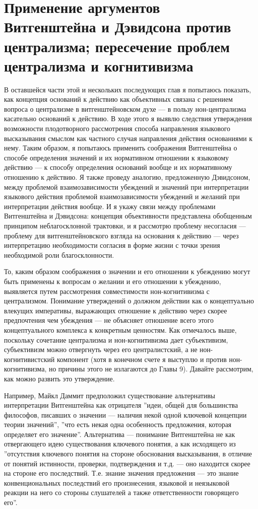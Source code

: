 \documentclass[11pt]{book}
\begin{document}
\section{Применение аргументов Витгенштейна и Дэвидсона против централизма; пересечение проблем централизма и когнитивизма}

В оставшейся части этой и нескольких последующих глав я попытаюсь показать, как концепция оснований к действию как объективных связана с решением вопроса о централизме в витгенштейновском духе --- в пользу нон-централизма касательно оснований к действию. В ходе этого я выявлю следствия утверждения возможности плодотворного рассмотрения способа направления языкового высказывания смыслом как частного случая направления действия основаниями к нему. Таким образом, я попытаюсь применить соображения Витгенштейна о способе определения значений и их нормативном отношении к языковому действию --- к способу определения оснований вообще и их нормативному отношению к действию. Я также проведу аналогию, предложенную Дэвидсоном, между проблемой взаимозависимости убеждений и значений при интерпретации языкового действия проблемой взаимозависимости убеждений и желаний при интерпретации действия вообще. И я укажу связи между проблемами Витгенштейна и Дэвидсона: концепция объективности представлена обобщенным принципом неблагосклонной трактовки, и я рассмотрю проблему несогласия --- проблему для витгенштейновского взгляда на основания к действию --- через интерпретацию необходимости согласия в форме жизни с точки зрения необходимой роли благосклонности.

То, каким образом соображения о значении и его отношении к убеждению могут быть применены к вопросам о желании и его отношении к убеждению, выявляется путем рассмотрения совместимости нон-когнитивизма с централизмом. Понимание утверждений о должном действии как о концептуально влекущих императивы, выражающих отношение к действию через скорее предпочтения чем убеждения --- не объясняет отношение всего этого концептуального комплекса к конкретным ценностям. Как отмечалось выше, поскольку сочетание централизма и нон-когнитивизма дает субъективизм, субъективизм можно отвергнуть через его централистский, а не нон-когнитивистский компонент (хотя в конечном счете я выступлю и против нон-когнитивизма, но причины этого не излагаются до Главы 9). Давайте рассмотрим, как можно развить это утверждение.

Например, Майкл Даммит предположил существование альтернативы интерпретации Витгенштейна как отрицателя ''идеи, общей для большинства философов, писавших о значении --- наличия некой одной ключевой концепции теории значений'', ''что есть некая одна особенность предложения, которая определяет его значение''. Альтернатива --- понимание Витгенштейна не как отвергающего идею существования ключевого понятия, а как исходящего из ''отсутствия ключевого понятия на стороне обоснования высказывания, в отличие от понятий истинности, проверки, подтверждения и т.д. --- оно находится скорее на стороне его последствий. Т.е. знание значения предложения --- это знание конвенциональных последствий его произнесения, языковой и неязыковой реакции на него со стороны слушателей а также ответственности говорящего его''.
\end{document}
